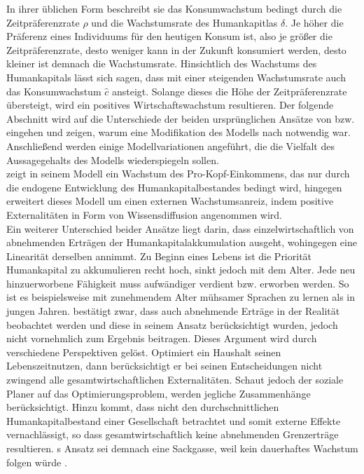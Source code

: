 %
In ihrer üblichen Form beschreibt sie das Konsumwachstum bedingt durch die Zeitpräferenzrate $\rho$ und die Wachstumsrate des Humankapitlas $\delta$. Je höher die Präferenz eines Individuums für den heutigen Konsum ist, also je größer die Zeitpräferenzrate, desto weniger kann in der Zukunft konsumiert werden, desto kleiner ist demnach die Wachstumsrate. Hinsichtlich des Wachstums des Humankapitals lässt sich sagen, dass mit einer steigenden Wachstumsrate auch das Konsumwachstum $\hat{c}$ ansteigt. Solange dieses die Höhe der Zeitpräferenzrate übersteigt, wird ein positives Wirtschaftswachstum resultieren.\bigskip
%
Der folgende Abschnitt wird auf die Unterschiede der beiden ursprünglichen Ansätze von \cite{Uzawa.1965} bzw. \cite{Lucas.1988} eingehen und zeigen, warum eine Modifikation des Modells nach \cite{Uzawa.1965} notwendig war. Anschließend werden einige Modellvariationen angeführt, die die Vielfalt des Aussagegehalts des Modells wiederspiegeln sollen.\\
%
\cite{Uzawa.1965} zeigt in seinem Modell ein Wachstum des Pro-Kopf-Einkommens, das nur durch die endogene Entwicklung des Humankapitalbestandes bedingt wird, \cite{Lucas.1988} hingegen erweitert dieses Modell um einen externen Wachstumsanreiz, indem positive Externalitäten in Form von Wissensdiffusion angenommen wird.\\
%
 Ein weiterer Unterschied beider Ansätze liegt darin, dass \cite{Lucas.1988} einzelwirtschaftlich von abnehmenden Erträgen der Humankapitalakkumulation ausgeht, wohingegen \cite{Uzawa.1965} eine Linearität derselben annimmt. Zu Beginn eines Lebens ist die Priorität Humankapital zu akkumulieren recht hoch, sinkt jedoch mit dem Alter. Jede neu hinzuerworbene Fähigkeit muss aufwändiger verdient bzw. erworben werden. So ist es beispielsweise mit zunehmendem Alter mühsamer Sprachen zu lernen als in jungen Jahren. \cite{Lucas.1988} bestätigt zwar, dass auch abnehmende Erträge in der Realität beobachtet werden und diese in seinem Ansatz berücksichtigt wurden, jedoch nicht vornehmlich zum Ergebnis beitragen. Dieses Argument wird durch verschiedene Perspektiven gelöst. Optimiert ein Haushalt seinen Lebenszeitnutzen, dann berücksichtigt er bei seinen Entscheidungen nicht zwingend alle gesamtwirtschaftlichen Externalitäten. Schaut jedoch der soziale Planer auf das Optimierungsproblem, werden jegliche Zusammenhänge berücksichtigt. Hinzu kommt, dass \cite{Uzawa.1965} nicht den durchschnittlichen Humankapitalbestand einer Gesellschaft betrachtet und somit externe Effekte vernachlässigt, so dass gesamtwirtschaftlich keine abnehmenden Grenzerträge resultieren. \cite{Uzawa.1965}s \citeyear{Uzawa.1965} Ansatz sei demnach eine Sackgasse, weil kein dauerhaftes Wachstum folgen würde \cite[S.~19]{Lucas.1988}.\\
